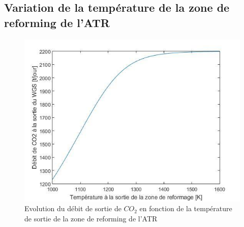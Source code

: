 \documentclass[12pt]{report}
\begin{document}
\subsection{Variation de la température de la zone de reforming de l'ATR}

\begin{figure}[H]
\begin{center}
\includegraphics[scale=0.6]{debit_CO2_Temperature}
\caption{Evolution du débit de sortie de $CO_2$ en fonction de la température de sortie de la zone de reforming de l'ATR}
\end{center}
\end{figure}
\end{document}
